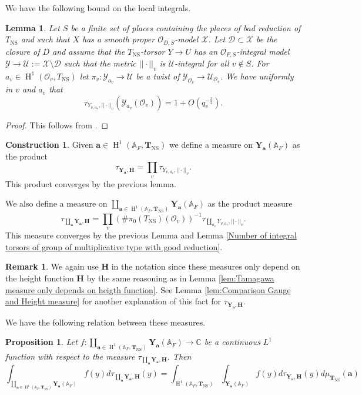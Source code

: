 \documentclass[a4paper,11pt,reqno]{amsart}
\newcommand{\C}{\mathbb{C}}
\newcommand{\A}{\mathbb{A}}
\DeclareMathOperator{\NS}{NS}
\DeclareMathOperator{\HH}{H}
\newtheorem{proposition}[theorem]{Proposition}
\newtheorem{lemma}[theorem]{Lemma}
\theoremstyle{definition}
\newtheorem{remark}[theorem]{Remark}
\newtheorem{construction}[theorem]{Construction}
\begin{document}
We have the following bound on the local integrals.
\begin{lemma}\label{lem:local measure universal torsor}
	Let $S$ be a finite set of places containing the places of bad reduction of $T_{\NS}$ and such that $X$ has a smooth proper $\mathcal{O}_{D, S}$-model $\mathcal{X}$.
 	Let $\mathcal{D} \subset \mathcal{X}$ be the closure of $D$ and assume that the $T_{\NS}$-torsor $Y \to U$ has an $\mathcal{O}_{F, S}$-integral model $\mathcal{Y} \to \mathcal{U} := \mathcal{X} \setminus \mathcal{D}$ such that the metric $||\cdot||_v$ is $\mathcal{U}$-integral for all $v \not \in S$. For $a_v \in \HH^1(\mathcal{O}_v, T_{\NS})$ let $\pi_v: \mathcal{Y}_{a_v} \to \mathcal{U}$ be a twist of $\mathcal{Y}_{\mathcal{O}_v} \to \mathcal{U}_{\mathcal{O}_v}$. We have uniformly in $v$ and $a_v$ that
	\[
	\tau_{Y_{v, a_v}, ||\cdot||_v}(\mathcal{Y}_{a_v}(\mathcal{O}_v))= 1 + O(q_v^{- \frac{3}{2}}).
	\]
\end{lemma}
\begin{proof}
	This follows from \cite[Thm~2.5, Rem.~2.9(c)]{Chambert-Loir2010Igusa}.
\end{proof}
\begin{construction}
	Given $\mathbf{a} \in \HH^1(\A_F, \mathbf{T}_{\NS})$ we define a measure on $\mathbf{Y}_{\mathbf{a}}(\A_F)$ as the product
	\[
	\tau_{\mathbf{Y}_{\mathbf{a}},\mathbf{H}} = \prod_{v} \tau_{Y_{v, a_v}, ||\cdot||_v}.
	\]
	This product converges by the previous lemma.
	
	We also define a measure on $\coprod_{\mathbf{a} \in \HH^1(\A_F, \mathbf{T}_{\NS})} \mathbf{Y}_{\mathbf{a}}(\A_F)$ as the product measure 
	\[
	\tau_{\coprod_{\mathbf{a}} \mathbf{Y}_{\mathbf{a}}, \mathbf{H}} = \prod_{v} (\# \pi_0(T_{\NS})(\mathcal{O}_v))^{-1}\tau_{\coprod_{a_v} Y_{v, a_v}, ||\cdot||_v}.
	\] 
	This measure converges by the previous Lemma and Lemma \ref{Number of integral torsors of group of multiplicative type with good reduction}.
\end{construction}
\begin{remark}
	We again use $\mathbf{H}$ in the notation since these measures only depend on the height function $\mathbf{H}$ by the same reasoning as in Lemma \ref{lem:Tamagawa measure only depends on heigth function}. See Lemma \ref{lem:Comparison Gauge and Height measure} for another explanation of this fact for $\tau_{\mathbf{Y}_{\mathbf{a}},\mathbf{H}}$.
\end{remark}
We have the following relation between these measures.
\begin{proposition}\label{prop:Relation between the two Tamagawa measures on Universal torsors}
	Let $f:\coprod_{\mathbf{a} \in \HH^1(\A_F, \mathbf{T}_{\NS})} \mathbf{Y}_{\mathbf{a}}(\A_F) \to \C$ be a continuous $L^1$ function with respect to the measure $\tau_{\coprod_{\mathbf{a}} \mathbf{Y}_{\mathbf{a}}, \mathbf{H}}$. Then
	\[
	\int_{\coprod_{\mathbf{a} \in \HH^1(\A_F, \mathbf{T}_{\NS})} \mathbf{Y}_{\mathbf{a}}(\A_F)} f(y)
	d\tau_{\coprod_{\mathbf{a}} \mathbf{Y}_{\mathbf{a}}, \mathbf{H}}(y) =
	\int_{\HH^1(\A_F, \mathbf{T}_{\NS})} 
	\int_{\mathbf{Y}_{\mathbf{a}}(\A_F)} f(y) d\tau_{\mathbf{Y}_{\mathbf{a}}, \mathbf{H}}(y) d\mu_{\mathbf{T}_{\NS}}(\mathbf{a})
	\]
\end{proposition}
\end{document}
